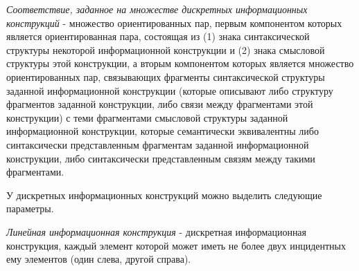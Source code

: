 \begin{SCn}

    \begin{scnindent}
    \end{scnindent}

\end{SCn}

\textit{Соответствие, заданное на множестве дискретных информационных конструкций} - множество ориентированных пар, первым компонентом которых является ориентированная пара, состоящая из (1) знака синтаксической структуры некоторой информационной конструкции и (2) знака смысловой структуры этой конструкции, а вторым компонентом которых является множество ориентированных пар, связывающих фрагменты синтаксической структуры заданной информационной конструкции (которые описывают либо структуру фрагментов заданной конструкции, либо связи между фрагментами этой конструкции) с теми фрагментами смысловой структуры заданной информационной конструкции, которые семантически эквивалентны либо синтаксически представленным фрагментам заданной информационной конструкции, либо синтаксически представленным связям между такими фрагментами.

У дискретных информационных конструкций можно выделить следующие параметры.

\begin{SCn}

    \begin{scnindent}
    \end{scnindent}

\end{SCn}

\textit{Линейная информационная конструкция} - дискретная информационная конструкция, каждый элемент которой может иметь не более двух инцидентных ему элементов (один слева, другой справа).

